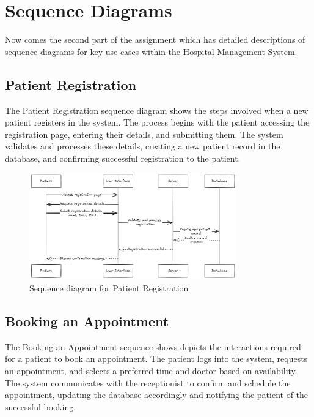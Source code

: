\documentclass[12pt]{article}
\begin{document}
\section*{Sequence Diagrams}
Now comes the second part of the assignment which has detailed descriptions of sequence diagrams for key use cases within the Hospital Management System. 

\subsection*{Patient Registration}
The Patient Registration sequence diagram shows the steps involved when a new patient registers in the system. The process begins with the patient accessing the registration page, entering their details, and submitting them. The system validates and processes these details, creating a new patient record in the database, and confirming successful registration to the patient.

\begin{figure}[h!]
\centering
\includegraphics[width=0.8\textwidth]{patient_registration_diagram.png}
\caption{Sequence diagram for Patient Registration}
\end{figure}

\subsection*{Booking an Appointment}
The Booking an Appointment sequence shows depicts the interactions required for a patient to book an appointment. The patient logs into the system, requests an appointment, and selects a preferred time and doctor based on availability. The system communicates with the receptionist to confirm and schedule the appointment, updating the database accordingly and notifying the patient of the successful booking.
\end{document}
